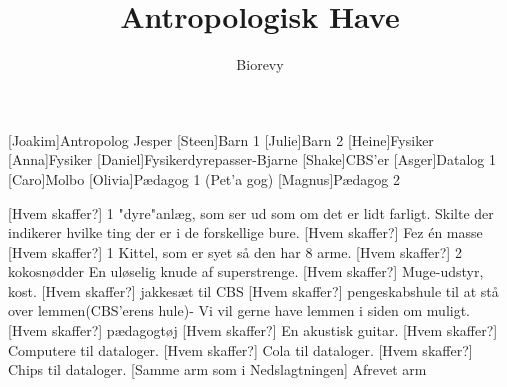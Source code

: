\documentclass[a4paper,12pt]{article}
\title{Antropologisk Have}
\author{Biorevy}
\begin{document}
\maketitle




\begin{roles}
	[Joakim]Antropolog Jesper
	[Steen]Barn 1
	[Julie]Barn 2
	[Heine]Fysiker
	[Anna]Fysiker
	[Daniel]Fysikerdyrepasser-Bjarne
	[Shake]CBS'er
	[Asger]Datalog 1
	[Caro]Molbo
	[Olivia]Pædagog 1 (Pet'a gog)
	[Magnus]Pædagog 2
\end{roles}


\begin{props}
	[Hvem skaffer?] 1 "dyre"anlæg, som ser ud som om det er lidt farligt. 
	 Skilte der indikerer hvilke ting der er i de forskellige bure.
	[Hvem skaffer?] Fez én masse
	[Hvem skaffer?] 1 Kittel, som er syet så den har 8 arme.
	[Hvem skaffer?] 2 kokosnødder
	 En uløselig knude af superstrenge.
	[Hvem skaffer?] Muge-udstyr, kost.
	[Hvem skaffer?] jakkesæt til CBS
	[Hvem skaffer?] pengeskabshule til at stå over lemmen(CBS'erens hule)- Vi vil gerne have lemmen i siden om muligt.
	[Hvem skaffer?] pædagogtøj
	[Hvem skaffer?] En akustisk guitar.
	[Hvem skaffer?] Computere til dataloger.
	[Hvem skaffer?] Cola til dataloger.
	[Hvem skaffer?] Chips til dataloger.
	[Samme arm som i Nedslagtningen] Afrevet arm
\end{props}
\end{document}
